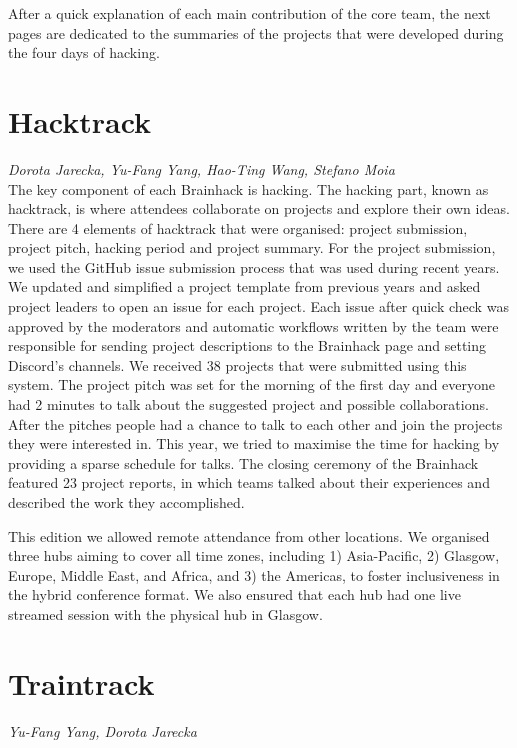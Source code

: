 \documentclass[10pt,a4paper,twocolumns]{proc}
\let\Oldsection\section
\renewcommand{\section}{\FloatBarrier\Oldsection}
\newcommand{\authors}[1]{\emph{\footnotesize #1} \\}
\begin{document}
After a quick explanation of each main contribution of the core team, the next pages are dedicated to the summaries of the projects that were developed during the four days of hacking.

\vfill\eject
\columnbreak

\section{Hacktrack}

\authors{Dorota Jarecka, %
Yu-Fang Yang, %
Hao-Ting Wang, %
Stefano Moia}
%

The key component of each Brainhack is hacking. The hacking part, known as
hacktrack, is where attendees collaborate on projects and explore their
own ideas. There are 4 elements of hacktrack that were organised:
project submission, project pitch, hacking period and project summary.
For the project submission, we used the GitHub issue submission process
that was used during recent years. We updated and simplified a
project template from previous years and asked project leaders to open
an issue for each project. Each issue after quick check was approved by
the moderators and automatic workflows written by the team were
responsible for sending project descriptions to the Brainhack page and
setting Discord's channels. We received 38 projects that were submitted
using this system. The project pitch was set for the morning of the
first day and everyone had 2 minutes to talk about the suggested project
and possible collaborations. After the pitches people had a chance to
talk to each other and join the projects they were interested in. This
year, we tried to maximise the time for hacking by providing a sparse
schedule for talks. The closing ceremony of the Brainhack featured 23
project reports, in which teams talked about their experiences and
described the work they accomplished.

This edition we allowed remote attendance from other locations. We
organised three hubs aiming to cover all time zones, including 1)
Asia-Pacific, 2) Glasgow, Europe, Middle East, and Africa, and 3) the
Americas, to foster inclusiveness in the hybrid conference format. We also
ensured that each hub had one live streamed session with the physical
hub in Glasgow.

\section{Traintrack}
\authors{Yu-Fang Yang, %
Dorota Jarecka}
%
\end{document}

